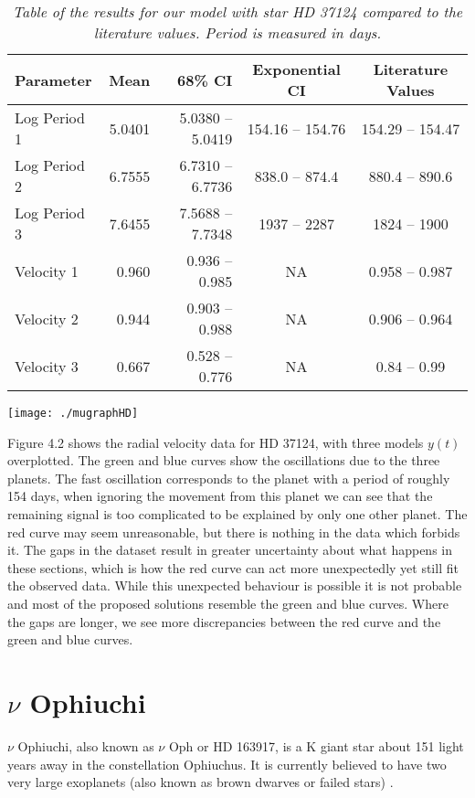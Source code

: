 \begin{table}[hbtp]
\centering
\begin{tabular}{|l|r|r|c|c|}
\hline
Parameter & Mean & 68\% CI & Exponential CI & Literature Values \\ \hline
Log Period 1 & 5.0401 & 5.0380 -- 5.0419 & 154.16 -- 154.76 & 154.29 -- 154.47\\
Log Period 2 & 6.7555 & 6.7310 -- 6.7736 & 838.0 -- 874.4 & 880.4 -- 890.6\\
Log Period 3 & 7.6455 & 7.5688 -- 7.7348 & 1937 -- 2287 & 1824 -- 1900\\
Velocity 1 & 0.960 & 0.936 -- 0.985 &  NA & 0.958 -- 0.987\\
Velocity 2 & 0.944 & 0.903 -- 0.988 &  NA & 0.906 -- 0.964\\
Velocity 3 & 0.667 & 0.528 -- 0.776 &  NA & 0.84 -- 0.99\\
\hline
\end{tabular}
\caption[Table 2]{\textit{Table of the results for our model with star HD 37124 compared to the literature values. Period is measured in days.}}
\end{table}

\noindent
\begin{minipage}{\linewidth}%
\centering
\texttt{[image: ./mugraphHD]}
\label{fig:muHD}
\end{minipage}

Figure 4.2 shows the radial velocity data for HD 37124, with three models $y(t)$ overplotted. The green and blue curves show the oscillations due to the three planets. The fast oscillation corresponds to the planet with a period of roughly 154 days, when ignoring the movement from this planet we can see that the remaining signal is too complicated to be explained by only one other planet. The red curve may seem unreasonable, but there is nothing in the data which forbids it. The gaps in the dataset result in greater uncertainty about what happens in these sections, which is how the red curve can act more unexpectedly yet still fit the observed data.  While this unexpected behaviour is possible it is not probable and most of the proposed solutions resemble the green and blue curves. Where the gaps are longer, we see more discrepancies between the red curve and the green and blue curves.

\section{$\nu$ Ophiuchi}
$\nu$ Ophiuchi, also known as $\nu$ Oph or HD 163917, is a K giant star about 151 light years away in the constellation Ophiuchus. It is currently believed to have two very large exoplanets (also known as brown dwarves or failed stars) \cite{2012PASJ...64..135S}.


